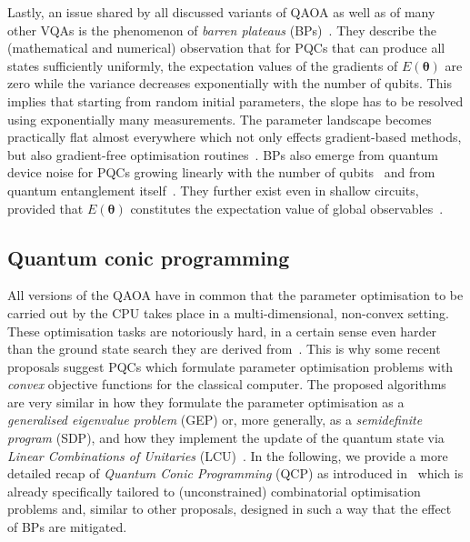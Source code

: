 \documentclass[10pt,conference]{IEEEtran}
\begin{document}
Lastly, an issue shared by all discussed variants of QAOA as well as of many other VQAs is the phenomenon of \emph{barren plateaus} (BPs)~\cite{Mcclean2018BarrenPlateausInQuantumNeuralNetworkTrainingLandscapes}.
They describe the (mathematical and numerical) observation that for PQCs that can produce all states sufficiently uniformly, the expectation values of the gradients of $E(\bm{\theta})$ are zero while the variance decreases exponentially with the number of qubits.
This implies that starting from random initial parameters, the slope has to be resolved using exponentially many measurements.
The parameter landscape becomes practically flat almost everywhere which not only effects gradient-based methods, but also gradient-free optimisation routines~\cite{Arrasmith2021EffectOfBarrenPlateausOnGradientFreeOptimization}.
BPs also emerge from quantum device noise for PQCs growing linearly with the number of qubits~\cite{Wang2021NoiseInducedBarrenPlateausInVariationalQuantumAlgorithms} and from quantum entanglement itself~\cite{OrtizMarrero2021EntanglementInducedBarrenPlateaus}.
They further exist even in shallow circuits, provided that $E(\bm{\theta})$ constitutes the expectation value of global observables~\cite{Cerezo2021CostFunctionDependentBarrenPlateausInShallowParametrizedQuantumCircuits}.


\subsection{\label{subsection:QuantumConicProgramming}Quantum conic programming}

All versions of the QAOA have in common that the parameter optimisation to be carried out by the CPU takes place in a multi-dimensional, non-convex setting.
These optimisation tasks are notoriously hard, in a certain sense even harder than the ground state search they are derived from~\cite{Bittel2021TrainingVariationalQuantumAlgorithmsIsNpHard}.
This is why some recent proposals suggest PQCs which formulate parameter optimisation problems with \emph{convex} objective functions for the classical computer.
The proposed algorithms are very similar in how they formulate the parameter optimisation as a \emph{generalised eigenvalue problem} (GEP) or, more generally, as a \emph{semidefinite program} (SDP), and how they implement the update of the quantum state via \emph{Linear Combinations of Unitaries} (LCU)~\cite{Childs2012HamiltonianSimulationUsingLinearCombinationsOfUnitaryOperations}.
In the following, we provide a more detailed recap of \emph{Quantum Conic Programming} (QCP) as introduced in~\cite{Binkowski2025FromBarrenPlateausThroughFertileValleysConicExtensionsOfParameterisedQuantumCircuits} which is already specifically tailored to (unconstrained) combinatorial optimisation problems and, similar to other proposals, designed in such a way that the effect of BPs are mitigated.
\end{document}
